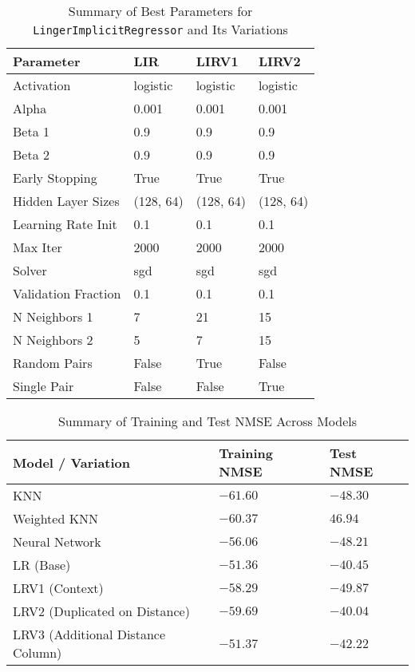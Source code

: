 \documentclass[a4paper, 12pt]{report}
\begin{document}
\begin{table}[H]
    \centering
    \caption{Summary of Best Parameters for \texttt{LingerImplicitRegressor} and Its Variations}
    \label{tab:best_parameters_LingerImageRegressor_variations_exp2}
    \begin{tabular}{|l|l|l|l|}
    \hline
    \textbf{Parameter} & \textbf{LIR} & \textbf{LIRV1} & \textbf{LIRV2} \\
    \hline
    Activation & logistic & logistic & logistic \\
    Alpha & 0.001 & 0.001 & 0.001 \\
    Beta 1 & 0.9 & 0.9 & 0.9 \\
    Beta 2 & 0.9 & 0.9 & 0.9 \\
    Early Stopping & True & True & True \\
    Hidden Layer Sizes & (128, 64) & (128, 64) & (128, 64) \\
    Learning Rate Init & 0.1 & 0.1 & 0.1 \\
    Max Iter & 2000 & 2000 & 2000 \\
    Solver & sgd & sgd & sgd \\
    Validation Fraction & 0.1 & 0.1 & 0.1 \\
    N Neighbors 1 & 7 & 21 & 15 \\
    N Neighbors 2 & 5 & 7 & 15 \\
    Random Pairs & False & True & False \\
    Single Pair & False & False & True \\
    \hline
    \end{tabular}
\end{table}

\begin{table}[H]
    \centering
    \caption{Summary of Training and Test NMSE Across Models}
    \label{tab:summary_nmse_all_models_MNSE_exp4}
    \small
    \begin{tabular}{|l|l|l|}
    \toprule
    \textbf{Model / Variation} & \textbf{Training NMSE} & \textbf{Test NMSE} \\
    \midrule
    KNN & $-61.60$ & $-48.30$ \\
    Weighted KNN & $-60.37$ & $46.94$ \\
    Neural Network & $-56.06$ & $-48.21$ \\
    LR (Base) & $-51.36$ & $-40.45$ \\
    LRV1 (Context) & $-58.29$ & $-49.87$ \\
    LRV2 (Duplicated on Distance) & $-59.69$ & $-40.04$ \\
    LRV3 (Additional Distance Column) & $-51.37$ & $-42.22$ \\
    \bottomrule
    \end{tabular}
\end{table}
\end{document}
